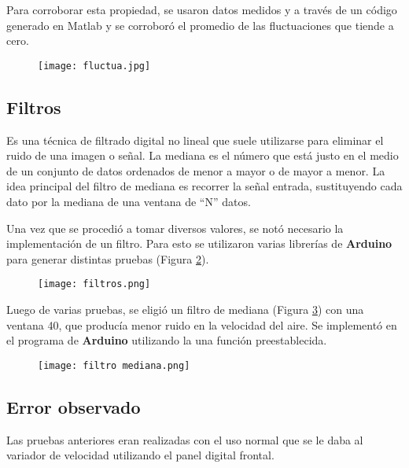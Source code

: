 Para corroborar esta propiedad, se usaron datos medidos y a través de un código generado en Matlab y se corroboró el promedio de las fluctuaciones que tiende a cero.
\begin{figure}[h!tb]
	\centering
	\texttt{[image: fluctua.jpg]}
	\label{fig:fluct2}
\end{figure}


\subsection{Filtros}
\begin{tcolorbox}[colback=blue!5!white,colframe=blue!75!black,title=Mediana]
	Es una técnica de filtrado digital no lineal que suele utilizarse para eliminar el ruido de una imagen o señal. La mediana es el número que está justo en el medio de un conjunto de datos ordenados de menor a mayor o de mayor a menor.
	La idea principal del filtro de mediana es recorrer la señal entrada, sustituyendo cada dato por la mediana de una ventana de “N” datos.
\end{tcolorbox}

Una vez que se procedió a tomar diversos valores, se notó necesario la implementación de un filtro. Para esto se utilizaron varias librerías de \textbf{Arduino} para generar distintas pruebas (Figura \ref{fig:filtros}).

\begin{figure}[!h]
	\centering
	\texttt{[image: filtros.png]}
	\label{fig:filtros}
\end{figure}

Luego de varias pruebas, se eligió un filtro de mediana (Figura \ref{fig:filtrosm}) con una ventana 40, que producía menor ruido en la velocidad del aire. Se implementó en el programa de \textbf{Arduino} utilizando la una función preestablecida.

\begin{figure}[htb]
	\centering
	\texttt{[image: filtro mediana.png]}
	\label{fig:filtrosm}
\end{figure}


\subsection{Error observado}
Las pruebas anteriores eran realizadas con el uso normal que se le daba al variador de velocidad utilizando el panel digital frontal.

